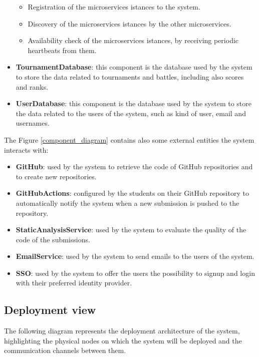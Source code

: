 \begin{itemize}
    \begin{itemize}
        \item Registration of the microservices istances to the system.
        \item Discovery of the microservices istances by the other microservices.
        \item Availability check of the microservices istances, by receiving periodic heartbeats from them.
    \end{itemize}
    \item \textbf{TournamentDatabase}: this component is the database used by the system to store the data related to tournaments and battles, including also scores and ranks.
    \item \textbf{UserDatabase}: this component is the database used by the system to store the data related to the users of the system, such as kind of user, email and usernames.
\end{itemize}
The Figure \ref{component_diagram} contains also some external entities the system interacts with:
\begin{itemize}
    \item \textbf{GitHub}: used by the system to retrieve the code of GitHub repositories and to create new repositories.
    \item \textbf{GitHubActions}: configured by the students on their GitHub repository to automatically notify the system when a new submission is pushed to the repository.
    \item \textbf{StaticAnalysisService}: used by the system to evaluate the quality of the code of the submissions.
    \item \textbf{EmailService}: used by the system to send emails to the users of the system.
    \item \textbf{SSO}: used by the system to offer the users the possibility to signup and login with their preferred identity provider.
\end{itemize}

\newpage
\subsection{Deployment view}
The following diagram represents the deployment architecture of the system, highlighting the physical nodes on which the system will be deployed and the communication channels between them.

